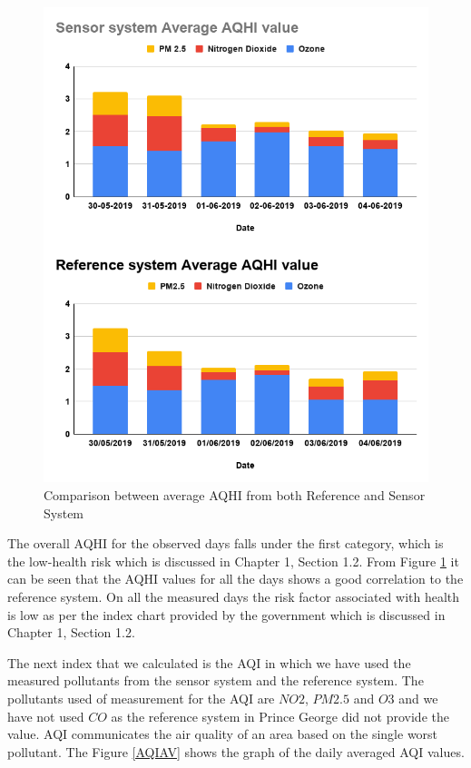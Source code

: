 \begin{figure}[h]
  \begin{center}
  \includegraphics[scale=0.53]{images/figure94.png}
  \end{center}
  \caption{Comparison between average AQHI from both Reference and Sensor System}
  \label{AQHIAV}
  \hspace{1 cm}
\end{figure}


The overall AQHI for the observed days falls under the first category, which is the low-health risk which is discussed in Chapter 1, Section 1.2. From Figure \ref{AQHIAV} it can be seen that the AQHI values for all the days shows a good correlation to the reference system. On all the measured days the risk factor associated with health is low as per the index chart provided by the government \cite{AQHICAN} which is discussed in Chapter 1, Section 1.2.

 The next index that we calculated is the AQI in which we have used the measured pollutants from the sensor system and the reference system. The pollutants used of measurement for the AQI are $NO2$, $PM2.5$ and $O3$ and we have not used $CO$ as the reference system in Prince George did not provide the value. AQI communicates the air quality of an area based on the single worst pollutant. The Figure \ref{AQIAV} shows the graph of the daily averaged AQI values.

